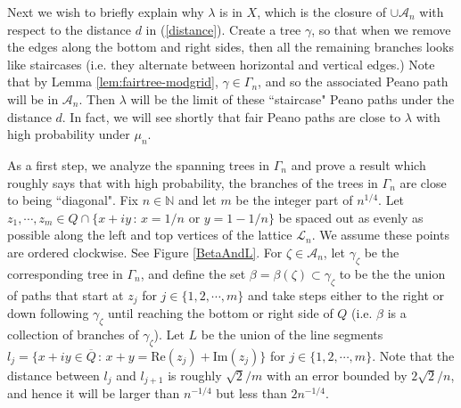 \documentclass[preprint,12pt]{elsarticle}
\theoremstyle{definition}
\theoremstyle{remark}
\numberwithin{equation}{section}
\begin{document}
 

Next we wish to briefly explain why $\lambda$  is in $X$, which is the closure of $\cup \mathcal{A}_n$ with respect to the distance $d$ in  (\ref{distance}).
Create a tree $\gamma$, so that when we remove the edges along the bottom and right sides, then all the remaining branches looks like staircases (i.e. they alternate between horizontal and vertical edges.)  
Note that by Lemma \ref {lem:fairtree-modgrid}, $\gamma \in \Gamma_n$, and so the associated Peano path will be in  $\mathcal{A}_n$.
Then $\lambda$ will be the limit of these ``staircase" Peano paths under the distance $d$.
In fact, we will see shortly that fair Peano paths are close to $\lambda$ with high probability under $\mu_n$.





As a first step, we analyze the spanning trees in $\Gamma_n$ and prove a result which roughly says that with high probability, the branches of the trees in $\Gamma_n$ are close to being ``diagonal".
Fix $n \in \mathbb{N}$ and let $m$ be the integer part of $n^{1/4}$.  
Let  $z_1, \cdots, z_m \in Q \cap \{x+iy \, : \, x = 1/n \text{ or } y = 1-1/n \}$ be spaced out as evenly as possible along the left and top vertices of the lattice $\mathcal{L}_n$.
We assume these points are ordered clockwise.  
See Figure \ref{BetaAndL}.
For $\zeta \in \mathcal{A}_n$, let $\gamma_\zeta$ be the corresponding tree in $\Gamma_n$, and define the set 
 $\beta = \beta(\zeta) \subset \gamma_\zeta$ to be the the union of paths that start at $z_j$ for $j \in \{1, 2, \cdots, m\}$ and take steps either to the right or down following $\gamma_\zeta$ until reaching the bottom or right side of $Q$ 
 (i.e. $\beta$ is a collection of branches of $\gamma_\zeta$).  
Let $L$ be the union of the line segments $l_j =\{ x+iy \in \overline{Q} \, : \, x + y = \text{Re}(z_j) + \text{Im}(z_j) \}$ for $j \in \{1, 2, \cdots, m\}$.
Note that the distance between $l_j$ and $l_{j+1}$ is roughly $\sqrt{2}/m$ with an error bounded by $2\sqrt{2}/n$, and hence it will be  larger than $n^{-1/4}$ but less than $2n^{-1/4}$.
\end{document}
